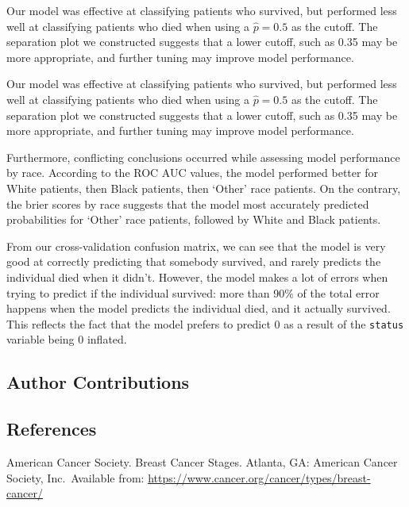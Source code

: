 \documentclass[]{article}
\begin{document}
Our model was effective at classifying patients who survived, but
performed less well at classifying patients who died when using a
\(\hat{p}=0.5\) as the cutoff. The separation plot we constructed
suggests that a lower cutoff, such as 0.35 may be more appropriate, and
further tuning may improve model performance.

Our model was effective at classifying patients who survived, but
performed less well at classifying patients who died when using a
\(\hat{p}=0.5\) as the cutoff. The separation plot we constructed
suggests that a lower cutoff, such as 0.35 may be more appropriate, and
further tuning may improve model performance.

Furthermore, conflicting conclusions occurred while assessing model
performance by race. According to the ROC AUC values, the model
performed better for White patients, then Black patients, then `Other'
race patients. On the contrary, the brier scores by race suggests that
the model most accurately predicted probabilities for `Other' race
patients, followed by White and Black patients.

From our cross-validation confusion matrix, we can see that the model is
very good at correctly predicting that somebody survived, and rarely
predicts the individual died when it didn't. However, the model makes a
lot of errors when trying to predict if the individual survived: more
than 90\% of the total error happens when the model predicts the
individual died, and it actually survived. This reflects the fact that
the model prefers to predict 0 as a result of the \texttt{status}
variable being 0 inflated.

\hypertarget{author-contributions}{%
\subsection{Author Contributions}\label{author-contributions}}

\hypertarget{references}{%
\subsection{References}\label{references}}

American Cancer Society. Breast Cancer Stages. Atlanta, GA: American
Cancer Society, Inc.~Available from:
\href{https://www.cancer.org/cancer/types/breast-cancer/understanding-a-breast-cancer-diagnosis/stages-of-breast-cancer.html\#:~:text=The\%20earliest\%20stage\%20breast\%20cancers,means\%20cancer\%20has\%20spread\%20more.}{https://www.cancer.org/cancer/types/breast-cancer/}
\end{document}
